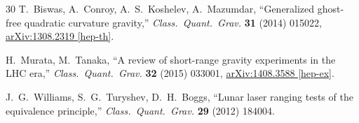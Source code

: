 \documentclass[11pt,a4paper]{article}
\theoremstyle{plain}
\theoremstyle{definition}
\theoremstyle{remark}
\begin{document}
\begin{thebibliography}{30}
T.~Biswas, A.~Conroy, A.~S.~Koshelev, A.~Mazumdar,
``Generalized ghost-free quadratic curvature gravity,''
\textit{Class.\ Quant.\ Grav.} \textbf{31} (2014) 015022,
\href{https://arxiv.org/abs/1308.2319}{arXiv:1308.2319 [hep-th]}.

H.~Murata, M.~Tanaka,
``A review of short-range gravity experiments in the LHC era,''
\textit{Class.\ Quant.\ Grav.} \textbf{32} (2015) 033001,
\href{https://arxiv.org/abs/1408.3588}{arXiv:1408.3588 [hep-ex]}.

J.~G.~Williams, S.~G.~Turyshev, D.~H.~Boggs,
``Lunar laser ranging tests of the equivalence principle,''
\textit{Class.\ Quant.\ Grav.} \textbf{29} (2012) 184004.

\end{thebibliography}
\end{document}
